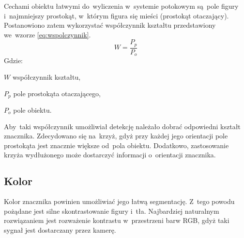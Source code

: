 Cechami obiektu łatwymi do~wyliczenia w~systemie potokowym są~pole figury i~najmniejszy prostokąt, w~którym figura się mieści (prostokąt otaczający). 
Postanowiono zatem wykorzystać współczynnik kształtu przedstawiony we~wzorze \ref{eq:wspolczynnik}.\\
\begin{equation} \label{eq:wspolczynnik}
W=\frac{P_p}{P_o}
\end{equation}
Gdzie:
\begin{eqwhere}[2cm]
	\item[$W$] współczynnik kształtu,
	\item[$P_p$] pole prostokąta otaczającego,
	\item[$P_o$] pole obiektu.
\end{eqwhere}
Aby~taki współczynnik umożliwiał detekcję należało dobrać odpowiedni kształt znacznika. 
Zdecydowano się na~krzyż, gdyż przy każdej jego orientacji pole prostokąta jest znacznie większe od~pola obiektu. Dodatkowo, zastosowanie krzyża wydłużonego może dostarczyć informacji o~orientacji znacznika.
\subsection{Kolor}
\label{subsec:kolor}

Kolor znacznika powinien umożliwiać jego łatwą segmentację. 
Z~tego powodu pożądane jest silne skontrastowanie figury i~tła. 
Najbardziej naturalnym rozwiązaniem jest rozważenie kontrastu w~przestrzeni barw RGB, gdyż taki sygnał jest dostarczany przez kamerę.

